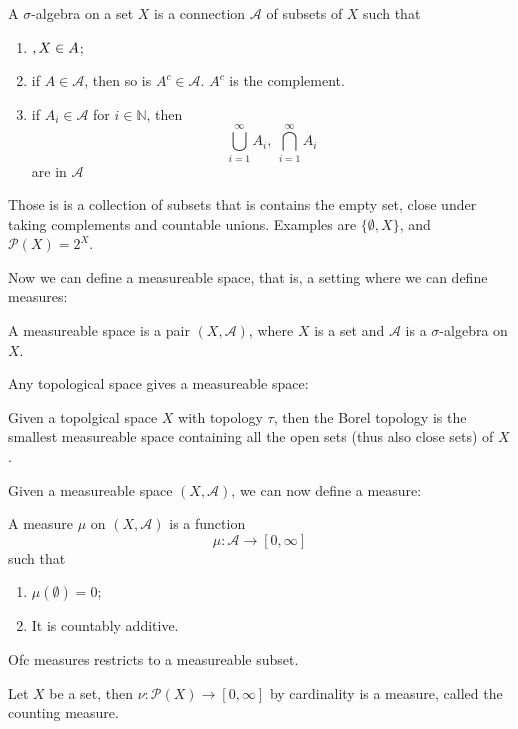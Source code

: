 \documentclass[main.tex]{subfiles}
\begin{document}
\begin{definition}
A $\sigma$-algebra on a set $X$ is a connection $\mathcal{A}$ of subsets of $X$ such that
\begin{enumerate}
    \item $\empty, X \in A$;
    \item if $A \in \mathcal{A}$, then so is $A^c \in \mathcal{A}$. $A^c$ is the complement.
    \item if $A_i \in \mathcal{A}$ for $i \in \mathbb{N}$, then 
    $$
    \bigcup_{i=1} ^{\infty} A_i,  \ \bigcap_{i=1} ^{\infty} A_i
    $$
    are in $\mathcal{A}$
\end{enumerate}
\end{definition}
Those is is a collection of subsets that is contains the empty set, close under taking complements and countable unions.
Examples are $\{ \emptyset, X \}$, and $\mathcal{P}(X) = 2^X$.

Now we can define a measureable space, that is, a setting where we can define measures:

\begin{definition}
A measureable space is a pair $(X, \mathcal{A})$, where $X$ is a set and $\mathcal{A}$ is a $\sigma$-algebra on $X$.
\end{definition}

Any topological space gives a measureable space:

\begin{definition}
Given a topolgical space $X$ with topology $\tau$, then the Borel topology is the smallest measureable space containing all the open sets (thus also close sets) of $X$. 
\end{definition}

Given a measureable space $(X, \mathcal{A})$, we can now define a measure:

\begin{definition}
A measure $\mu$ on $(X, \mathcal{A})$ is a function 
$$
\mu: \mathcal{A} \rightarrow [0, \infty]
$$
such that 
\begin{enumerate}
    \item $\mu(\emptyset) = 0$;
    \item It is countably additive.
\end{enumerate}
\end{definition}

Ofc measures restricts to a measureable subset. 

\begin{example}
Let $X$ be a set, then $\nu: \mathcal{P}(X) \rightarrow [0, \infty]$ by cardinality is a measure, called the counting measure. 
\end{example}
\end{document}

